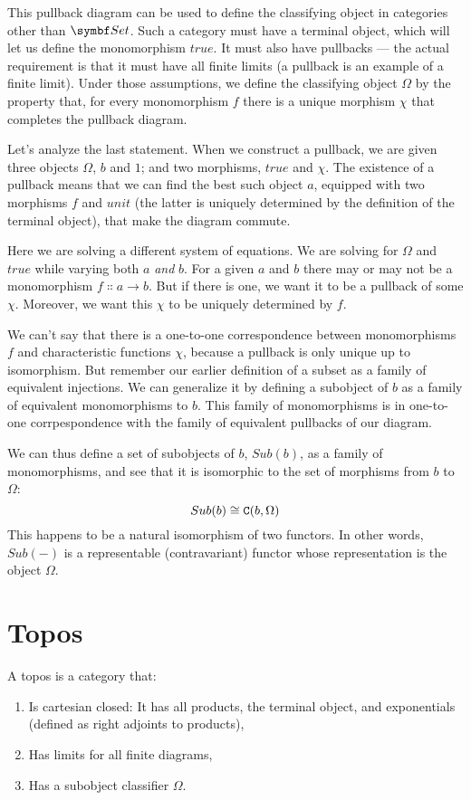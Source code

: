 This pullback diagram can be used to define the classifying object in
categories other than $\Set$. Such a category must have a terminal
object, which will let us define the monomorphism $true$. It must
also have pullbacks --- the actual requirement is that it must have all
finite limits (a pullback is an example of a finite limit). Under those
assumptions, we define the classifying object $\Omega$ by the property
that, for every monomorphism $f$ there is a unique morphism
$\chi$ that completes the pullback diagram.

Let's analyze the last statement. When we construct a pullback, we are
given three objects $\Omega$, $b$ and $1$; and two
morphisms, $true$ and $\chi$. The existence of a pullback
means that we can find the best such object $a$, equipped with
two morphisms $f$ and $unit$ (the latter is uniquely
determined by the definition of the terminal object), that make the
diagram commute.

Here we are solving a different system of equations. We are solving for
$\Omega$ and $true$ while varying both $a$ \emph{and}
$b$. For a given $a$ and $b$ there may or may not
be a monomorphism $f \Colon a \to b$. But if there is one, we
want it to be a pullback of some $\chi$. Moreover, we want this
$\chi$ to be uniquely determined by $f$.

We can't say that there is a one-to-one correspondence between
monomorphisms $f$ and characteristic functions $\chi$,
because a pullback is only unique up to isomorphism. But remember our
earlier definition of a subset as a family of equivalent injections. We
can generalize it by defining a subobject of $b$ as a family of
equivalent monomorphisms to $b$. This family of monomorphisms is
in one-to-one corrpespondence with the family of equivalent pullbacks of
our diagram.

We can thus define a set of subobjects of $b$, $Sub(b)$,
as a family of monomorphisms, and see that it is isomorphic to the set
of morphisms from $b$ to $\Omega$:
\[Sub(b) \cong \texttt{C}(b, \Omega)\]
This happens to be a natural isomorphism of two functors. In other
words, $Sub(-)$ is a representable (contravariant) functor whose
representation is the object $\Omega$.

\section{Topos}

A topos is a category that:

\begin{enumerate}
\tightlist
\item
  Is cartesian closed: It has all products, the terminal object, and
  exponentials (defined as right adjoints to products),
\item
  Has limits for all finite diagrams,
\item
  Has a subobject classifier $\Omega$.
\end{enumerate}

